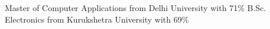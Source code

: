 %
%
%


\begin{scholarship}
					{Master of Computer Applications from Delhi University with 71\%}
					{B.Sc. Electronics from Kurukshetra University with  69\%}
\end{scholarship}